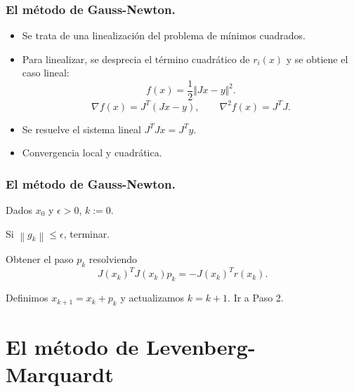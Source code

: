 \documentclass{beamer}
\newcommand{\norm}[1]{\left\lVert#1\right\rVert}
\begin{document}
\begin{frame}
    \frametitle{El método de Gauss-Newton.}
    \begin{itemize}[label=\textbullet]
        \item Se trata de una linealización del problema de mínimos cuadrados. \pause
        \item Para linealizar, se desprecia el término cuadrático de $r_i(x)$ y se obtiene el caso lineal:
        \begin{equation*}
            f(x) = \frac{1}{2} \Vert Jx-y \Vert^2.
        \end{equation*}
        \begin{equation*}
            \nabla f(x) = J^T(Jx-y), \qquad \nabla^2 f(x) =  J^TJ.
        \end{equation*}
        \pause
        \item Se resuelve el sistema lineal $J^TJx = J^Ty$. \pause
        \item Convergencia local y cuadrática.
    \end{itemize}
\end{frame}

\begin{frame}
    \frametitle{El método de Gauss-Newton.}
    \begin{steps}
        \item Dados $x_0$ y $\epsilon > 0$, $k:=0$.
        \item Si $\norm{g_k} \leq \epsilon$, terminar.
        \item Obtener el paso $p_k$ resolviendo
            \begin{equation}
                J(x_k)^TJ(x_k)p_k = -J(x_k)^Tr(x_k).
            \end{equation}
        \item Definimos $x_{k+1} = x_k + p_k$ y actualizamos $k=k+1$. Ir a Paso 2.
    \end{steps}

\end{frame}


\section{El método de Levenberg-Marquardt}
\end{document}
